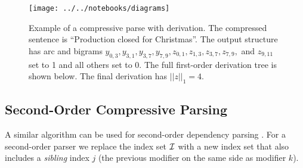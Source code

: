 \documentclass[11pt,a4paper]{article}
\newcommand{\IndexSet}{{\cal I}}
\newcommand{\rtrap}{\scalebox{0.2}{\tikz{
    \coordinate (A) at (0,0);
    \coordinate (B) at (90:1.5cm);
    \coordinate (C) at (2.5,0.9cm);
    \coordinate (D) at (0:2.5cm);
    \draw[line width = 0.05cm] (A)--(B)--(C)--(D)--cycle;
    }}}
\newcommand{\ltrap}{\scalebox{0.2}{\tikz{
    \coordinate (A) at (0,0);
    \coordinate (B) at (90:1.5cm);
    \coordinate (C) at (-2.5,0.9cm);
    \coordinate (D) at (180:2.5cm);
    \draw[line width = 0.05cm] (A)--(B)--(C)--(D)--cycle;
    }}}
\newcommand{\rtriskip}{\scalebox{0.2}{\tikz{
      \begin{scope}[decoration={
          markings,
          mark=at position 0.7 with {\arrow[scale=2.75]{|}}
        }]
    \coordinate (A) at (0,0);
    \coordinate (B) at (90:1.5cm);
    \coordinate (C) at (180:-1.7cm);
        \draw[postaction={decorate}, line width = 0.05cm] (B) -- (C);
        \draw[line width = 0.05cm] (A)--(B)--(C)--cycle;
      \end{scope}
    }}}
\newcommand{\rtri}{\scalebox{0.2}{\tikz{
    \coordinate (A) at (0,0);
    \coordinate (B) at (90:1.5cm);
    \coordinate (C) at (180:-1.7cm);
    \draw[line width = 0.05cm] (A)--(B)--(C)--cycle;
    }}}
\newcommand{\ltri}{\scalebox{0.2}{\tikz{
    \coordinate (A) at (0,0);
    \coordinate (B) at (90:1.5cm);
    \coordinate (C) at (180:1.7cm);
    \draw[line width = 0.05cm] (A)--(B)--(C)--cycle;
    }}}
\begin{document}












\begin{figure*}
  \centering
  \texttt{[image: ../../notebooks/diagrams]}
  \label{fig:parse}
  \caption{Example of a compressive parse with derivation. The compressed sentence is ``Production closed for Christmas''. The output structure has arc and bigrams $y_{0,3}, y_{3,1},y_{3,7},y_{7,9},z_{0,1},z_{1,3},z_{3,7}, z_{7,9},$ and $z_{9,11}$ set to 1 and all others set to 0. The full first-order derivation tree is shown below. The final derivation has $||z||_1=4$. }
\end{figure*}


\subsection{Second-Order Compressive Parsing}

A similar algorithm can be used for second-order dependency parsing \cite{}. For a second-order parser
we replace the index set $\IndexSet$ with a new index set that also includes a \textit{sibling}
index $j$ (the previous modifier on the same side as modifier $k$). 
\end{document}
